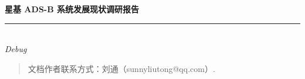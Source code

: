 
\thispagestyle{empty}

\noindent\begin{minipage}{\textwidth}
\raggedleft
{\huge \bfseries 星基 ADS-B 系统发展现状调研报告}
\noindent\rule[-1ex]{\textwidth}{5pt}\\[2.5ex]
\hfill\emph{\Large Debug}
\end{minipage}

\noindent{}


\begin{quote}\footnotesize
  文档作者联系方式：刘通（sunnyliutong@qq.com）.
\end{quote}